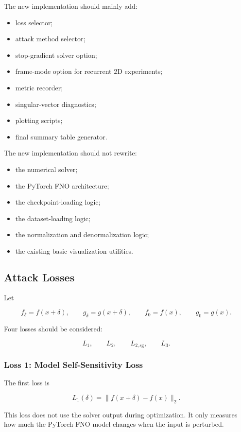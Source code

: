 \documentclass{article}
\begin{document}
The new implementation should mainly add:

\begin{itemize}
    \item loss selector;
    \item attack method selector;
    \item stop-gradient solver option;
    \item frame-mode option for recurrent 2D experiments;
    \item metric recorder;
    \item singular-vector diagnostics;
    \item plotting scripts;
    \item final summary table generator.
\end{itemize}

The new implementation should not rewrite:

\begin{itemize}
    \item the numerical solver;
    \item the PyTorch FNO architecture;
    \item the checkpoint-loading logic;
    \item the dataset-loading logic;
    \item the normalization and denormalization logic;
    \item the existing basic visualization utilities.
\end{itemize}

\subsection{Attack Losses}

Let

\[
f_\delta = f(x+\delta),
\qquad
g_\delta = g(x+\delta),
\qquad
f_0 = f(x),
\qquad
g_0 = g(x).
\]

Four losses should be considered:

\[
L_1,
\qquad
L_2,
\qquad
L_{2,\mathrm{sg}},
\qquad
L_3.
\]

\subsubsection{Loss 1: Model Self-Sensitivity Loss}

The first loss is

\[
L_1(\delta)
=
\|f(x+\delta)-f(x)\|_2.
\]

This loss does not use the solver output during optimization. It only measures how much the PyTorch FNO model changes when the input is perturbed.
\end{document}
